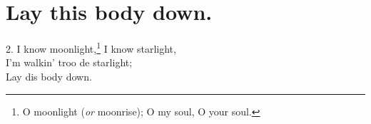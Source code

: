 \documentclass[a5paper,10pt]{book}
\begin{document}
\newpage
\section{Lay this body down.}
\thispagestyle{empty}

\begin{song}
\end{song}

\begin{stanza}
\item[2.]
  I know moonlight,\footnote[1]{O moonlight (\emph{or}
  moonrise); O my soul, O your soul.} I know starlight, \\
  I'm walkin' troo de starlight; \\
  Lay dis body down.
\end{stanza}
\end{document}
